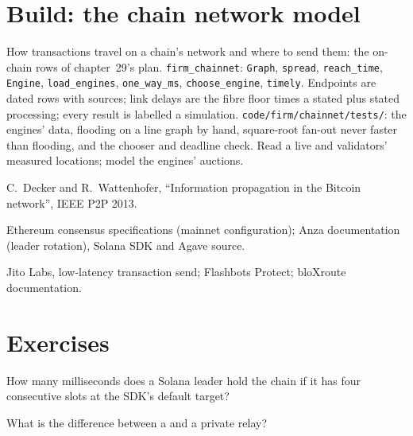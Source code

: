 \section{Build: the chain network model}\label{bld:nw:on-chain-connectivity:chainnet}

\begin{build}
 How transactions travel on a chain's network and where to send them: the on-chain rows of chapter~29's plan.
 \texttt{firm\_chainnet}: \texttt{Graph}, \texttt{spread}, \texttt{reach\_time}, \texttt{Engine}, \texttt{load\_engines},
\texttt{one\_way\_ms}, \texttt{choose\_engine}, \texttt{timely}.
 Endpoints are dated rows with sources; link delays are the fibre floor times a stated  plus stated processing; every result
is labelled a simulation.
 \texttt{code/firm/chainnet/tests/}: the engines' data, flooding on a line graph by hand, square-root fan-out never faster
than flooding, and the chooser and deadline check.
 Read a live  and validators' measured locations; model the engines' auctions.
\end{build}

\begin{omsources}
\item C.~Decker and R.~Wattenhofer, ``Information propagation in the Bitcoin network'', IEEE P2P 2013.
\item Ethereum consensus specifications (mainnet configuration); Anza documentation (leader rotation), Solana SDK and Agave source.
\item Jito Labs, low-latency transaction send; Flashbots Protect; bloXroute documentation.
\end{omsources}

\section{Exercises}

\begin{exercise}[$\star$]\label{exo:nw:on-chain-connectivity:1}
How many milliseconds does a Solana leader hold the chain if it has four consecutive slots at the SDK's default target?
\end{exercise}

\begin{exercise}[$\star$]\label{exo:nw:on-chain-connectivity:2}
What is the difference between a  and a private relay?
\end{exercise}

